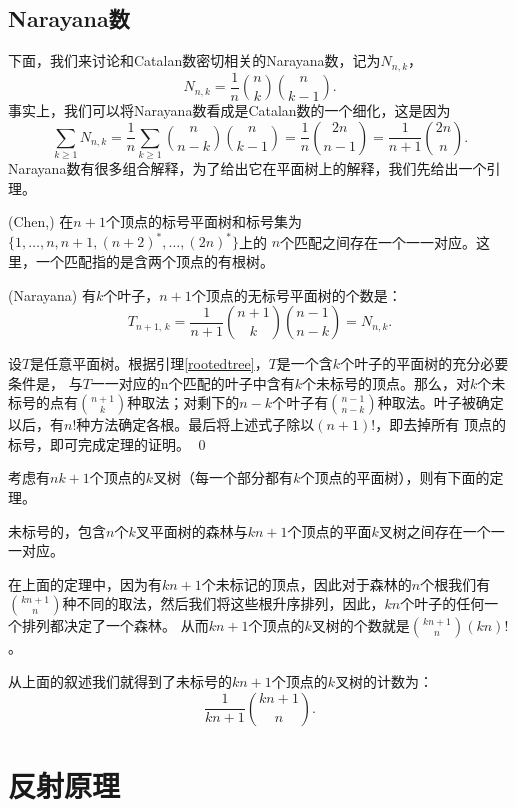 \subsection{Narayana数}
下面，我们来讨论和Catalan数密切相关的Narayana数，记为$N_{n,k}$，
\begin{equation}
N_{n,k}=\frac{1}{n}{n \choose k}{n \choose k-1}.
\end{equation}
事实上，我们可以将Narayana数看成是Catalan数的一个细化，这是因为
\[
\sum\limits_{k\geq 1}N_{n,k}=\frac{1}{n}\sum\limits_{k\geq 1}{n
\choose n-k}{n \choose k-1}=\frac{1}{n}{2n \choose
n-1}=\frac{1}{n+1}{2n \choose n}.
\]
Narayana数有很多组合解释，为了给出它在平面树上的解释，我们先给出一个引理。
\begin{lem}\label{rootedtree}{\rm(Chen,\cite{Chen1990})}
在$n+1$个顶点的标号平面树和标号集为$\{1,\ldots,n,n+1,(n+2)^{*},\ldots,(2n)^{*}\}$上的
$n$个匹配之间存在一个一一对应。这里，一个匹配指的是含两个顶点的有根树。
\end{lem}
\begin{thm}\label{theorem1.3}{\rm(Narayana)}
有$k$个叶子，$n+1$个顶点的无标号平面树的个数是{\rm：}
\[ T_{n+1,\,k} =\frac {1}{n+1} {n+1 \choose k}{n-1\choose n-k}=N_{n,k}.\]
\end{thm}
\pf
设$T$是任意平面树。根据引理\ref{rootedtree}，$T$是一个含$k$个叶子的平面树的充分必要条件是，
与$T
$一一对应的n个匹配的叶子中含有$k$个未标号的顶点。那么，对$k$个未标号的点有${n+1\choose
k}$种取法；对剩下的$n-k$个叶子有${n-1\choose
n-k}$种取法。叶子被确定以后，有$n!$种方法确定各根。最后将上述式子除以$(n+1)!$，即去掉所有
顶点的标号，即可完成定理的证明。 \qed

考虑有$nk+1$个顶点的$k$叉树（每一个部分都有$k$个顶点的平面树），则有下面的定理。

\begin{thm}
未标号的，包含$n$个$k$叉平面树的森林与$kn+1$个顶点的平面$k$叉树之间存在一个一一对应。
\end{thm}
在上面的定理中，因为有$kn+1$个未标记的顶点，因此对于森林的$n$个根我们有${kn+1\choose
n}$种不同的取法，然后我们将这些根升序排列，因此，$kn$个叶子的任何一个排列都决定了一个森林。
从而$kn+1 $个顶点的$k $叉树的个数就是${kn+1\choose n}(kn)!$。

从上面的叙述我们就得到了未标号的$kn+1$个顶点的$k$叉树的计数为：
$$\frac{1}{kn+1}{kn + 1\choose n}.$$

\section{反射原理}

